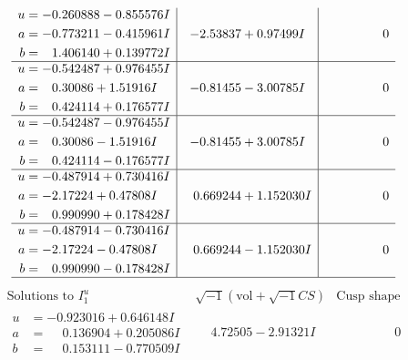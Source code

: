 \documentclass[1p]{elsarticle_modified}
\theoremstyle{definition}
\newcommand{\I}{\sqrt{-1}}
\begin{document}
$$\begin{array}{c|c|c}
\begin{aligned}
u &= -0.260888 - 0.855576 I \\
a &= -0.773211 - 0.415961 I \\
b &= \phantom{-}1.406140 + 0.139772 I\end{aligned}
 & -2.53837 + 0.97499 I & \phantom{-0.000000 } 0 \\ \hline\begin{aligned}
u &= -0.542487 + 0.976455 I \\
a &= \phantom{-}0.30086 + 1.51916 I \\
b &= \phantom{-}0.424114 + 0.176577 I\end{aligned}
 & -0.81455 - 3.00785 I & \phantom{-0.000000 } 0 \\ \hline\begin{aligned}
u &= -0.542487 - 0.976455 I \\
a &= \phantom{-}0.30086 - 1.51916 I \\
b &= \phantom{-}0.424114 - 0.176577 I\end{aligned}
 & -0.81455 + 3.00785 I & \phantom{-0.000000 } 0 \\ \hline\begin{aligned}
u &= -0.487914 + 0.730416 I \\
a &= -2.17224 + 0.47808 I \\
b &= \phantom{-}0.990990 + 0.178428 I\end{aligned}
 & \phantom{-}0.669244 + 1.152030 I & \phantom{-0.000000 } 0 \\ \hline\begin{aligned}
u &= -0.487914 - 0.730416 I \\
a &= -2.17224 - 0.47808 I \\
b &= \phantom{-}0.990990 - 0.178428 I\end{aligned}
 & \phantom{-}0.669244 - 1.152030 I & \phantom{-0.000000 } 0\\
 \hline 
 \end{array}$$\newpage$$\begin{array}{c|c|c}  
\text{Solutions to }I^u_{1}& \I (\text{vol} + \sqrt{-1}CS) & \text{Cusp shape}\\
 \hline 
\begin{aligned}
u &= -0.923016 + 0.646148 I \\
a &= \phantom{-}0.136904 + 0.205086 I \\
b &= \phantom{-}0.153111 - 0.770509 I\end{aligned}
 & \phantom{-}4.72505 - 2.91321 I & \phantom{-0.000000 } 0 \\ \hline\begin{aligned}

\end{aligned}
\end{array}$$
\end{document}
